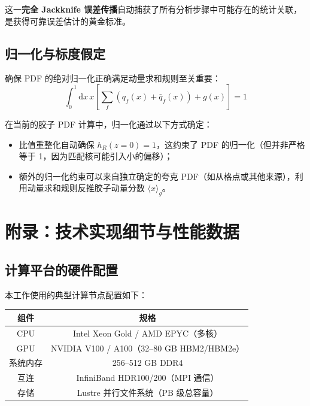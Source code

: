 \documentclass[11pt,a4paper]{ctexart}
\begin{document}
这一\textbf{完全 Jackknife 误差传播}自动捕获了所有分析步骤中可能存在的统计关联，是获得可靠误差估计的黄金标准。

\subsection{归一化与标度假定}

确保 PDF 的绝对归一化正确满足动量求和规则至关重要：
\begin{equation}
\int_0^1 \mathrm{d}x \, x \left[ \sum_f (q_f(x) + \bar{q}_f(x)) + g(x) \right] = 1
\end{equation}

在当前的胶子 PDF 计算中，归一化通过以下方式确定：
\begin{itemize}
  \item 比值重整化自动确保 $h_R(z=0) = 1$，这约束了 PDF 的归一化（但并非严格等于 1，因为匹配核可能引入小的偏移）；
  \item 额外的归一化约束可以来自独立确定的夸克 PDF（如从格点或其他来源），利用动量求和规则反推胶子动量分数 $\langle x \rangle_g$。
\end{itemize}

\section{附录：技术实现细节与性能数据}

\subsection{计算平台的硬件配置}

本工作使用的典型计算节点配置如下：

\begin{center}
\begin{tabular}{c c}
\toprule
\textbf{组件} & \textbf{规格} \\
\midrule
CPU & Intel Xeon Gold / AMD EPYC（多核） \\
GPU & NVIDIA V100 / A100（32--80 GB HBM2/HBM2e） \\
系统内存 & 256--512 GB DDR4 \\
互连 & InfiniBand HDR100/200（MPI 通信） \\
存储 & Lustre 并行文件系统（PB 级总容量） \\
\bottomrule
\end{tabular}
\end{center}
\end{document}
